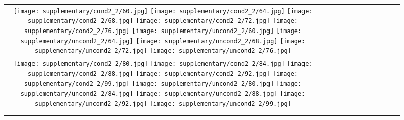 \begin{figure*}[tb!]
{\begin{tabular}{c c c c c c c c c c c c }
\tabularnewline
  \texttt{[image: supplementary/cond2\_2/60.jpg]}
  \texttt{[image: supplementary/cond2\_2/64.jpg]}
  \texttt{[image: supplementary/cond2\_2/68.jpg]}
  \texttt{[image: supplementary/cond2\_2/72.jpg]}
  \texttt{[image: supplementary/cond2\_2/76.jpg]}
  \hspace{5mm}
  \texttt{[image: supplementary/uncond2\_2/60.jpg]}
  \texttt{[image: supplementary/uncond2\_2/64.jpg]}
  \texttt{[image: supplementary/uncond2\_2/68.jpg]}
  \texttt{[image: supplementary/uncond2\_2/72.jpg]}
  \texttt{[image: supplementary/uncond2\_2/76.jpg]}

\tabularnewline
  \texttt{[image: supplementary/cond2\_2/80.jpg]}
  \texttt{[image: supplementary/cond2\_2/84.jpg]}
  \texttt{[image: supplementary/cond2\_2/88.jpg]}
  \texttt{[image: supplementary/cond2\_2/92.jpg]}
  \texttt{[image: supplementary/cond2\_2/99.jpg]}
  \hspace{5mm}
  \texttt{[image: supplementary/uncond2\_2/80.jpg]}
  \texttt{[image: supplementary/uncond2\_2/84.jpg]}
  \texttt{[image: supplementary/uncond2\_2/88.jpg]}
  \texttt{[image: supplementary/uncond2\_2/92.jpg]}
  \texttt{[image: supplementary/uncond2\_2/99.jpg]}
    \tabularnewline

 \hspace{0.5mm}
  \tabularnewline
\vspace{2mm}
\vspace{-2\baselineskip}
\end{tabular}}
\vspace{-0.8cm}
\hspace{20pt}
\label{fig:sup22}
\vspace{-2mm}
\end{figure*}%